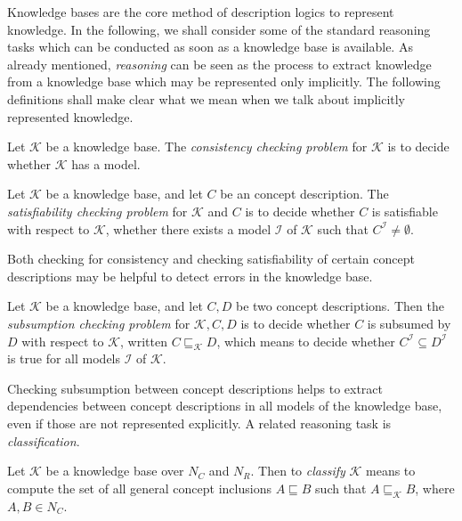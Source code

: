 Knowledge bases are the core method of description logics to represent knowledge.  In the
following, we shall consider some of the standard reasoning tasks which can be conducted
as soon as a knowledge base is available.  As already mentioned, \emph{reasoning} can be
seen as the process to extract knowledge from a knowledge base which may be represented
only implicitly.  The following definitions shall make clear what we mean when we talk
about implicitly represented knowledge.

\begin{Definition}
  \label{def:concistency-checking}
  Let $\mathcal{K}$ be a knowledge base.  The \emph{consistency checking problem} for
  $\mathcal{K}$ is to decide whether $\mathcal{K}$ has a model.
\end{Definition}

\begin{Definition}
  \label{def:satisfiability-checking}
  Let $\mathcal{K}$ be a knowledge base, and let $C$ be an concept description.  The
  \emph{satisfiability checking problem} for $\mathcal{K}$ and $C$ is to decide whether
  $C$ is satisfiable with respect to $\mathcal{K}$, \ie whether there exists a model
  $\mathcal{I}$ of $\mathcal{K}$ such that $C^{\mathcal{I}} \neq \emptyset$.
\end{Definition}

Both checking for consistency and checking satisfiability of certain concept descriptions
may be helpful to detect errors in the knowledge base.

\begin{Definition}
  \label{def:subsumption-checking}
  Let $\mathcal{K}$ be a knowledge base, and let $C, D$ be two concept descriptions.  Then
  the \emph{subsumption checking problem} for $\mathcal{K}, C, D$ is to decide whether $C$
  is subsumed by $D$ with respect to $\mathcal{K}$, written $C \sqsubseteq_{\mathcal{K}}
  D$, which means to decide whether $C^{\mathcal{I}} \subseteq D^{\mathcal{I}}$ is true
  for all models $\mathcal{I}$ of $\mathcal{K}$.
\end{Definition}

Checking subsumption between concept descriptions helps to extract dependencies between
concept descriptions in all models of the knowledge base, even if those are not
represented explicitly.  A related reasoning task is \emph{classification}.

\begin{Definition}[Classification]
  \label{def:classification}
  Let $\mathcal{K}$ be a knowledge base over $N_{C}$ and $N_{R}$.  Then to \emph{classify}
  $\mathcal{K}$ means to compute the set of all general concept inclusions $A \sqsubseteq
  B$ such that $A \sqsubseteq_{\mathcal{K}} B$, where $A, B \in N_{C}$.
\end{Definition}

